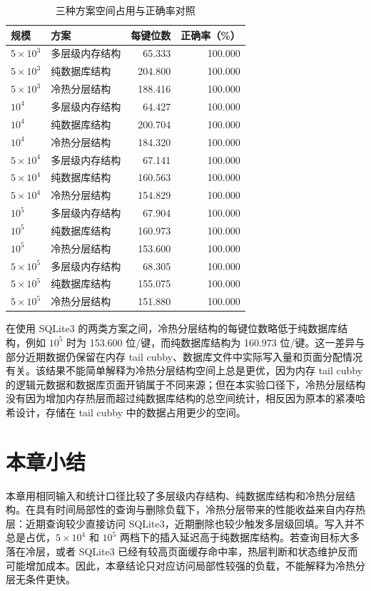 \begin{table}[htbp]
  \centering
  \caption{三种方案空间占用与正确率对照}
  \label{tab:hotcold-space-correctness}
  \small
  \begin{tabular}{llrr}
    \toprule
    规模 & 方案 & 每键位数 & 正确率（\%） \\
    \midrule
    \(5\times10^3\)   & 多层级内存结构 & 65.333  & 100.000 \\
    \(5\times10^3\)   & 纯数据库结构   & 204.800 & 100.000 \\
    \(5\times10^3\)   & 冷热分层结构   & 188.416 & 100.000 \\
    \(10^4\)          & 多层级内存结构 & 64.427  & 100.000 \\
    \(10^4\)          & 纯数据库结构   & 200.704 & 100.000 \\
    \(10^4\)          & 冷热分层结构   & 184.320 & 100.000 \\
    \(5\times10^4\)   & 多层级内存结构 & 67.141  & 100.000 \\
    \(5\times10^4\)   & 纯数据库结构   & 160.563 & 100.000 \\
    \(5\times10^4\)   & 冷热分层结构   & 154.829 & 100.000 \\
    \(10^5\)          & 多层级内存结构 & 67.904  & 100.000 \\
    \(10^5\)          & 纯数据库结构   & 160.973 & 100.000 \\
    \(10^5\)          & 冷热分层结构   & 153.600 & 100.000 \\
    \(5\times10^5\)   & 多层级内存结构 & 68.305  & 100.000 \\
    \(5\times10^5\)   & 纯数据库结构   & 155.075 & 100.000 \\
    \(5\times10^5\)   & 冷热分层结构   & 151.880 & 100.000 \\
    \bottomrule
  \end{tabular}
\end{table}

在使用 SQLite3 的两类方案之间，冷热分层结构的每键位数略低于纯数据库结构，例如 \(10^5\) 时为 153.600 位/键，而纯数据库结构为 160.973 位/键。这一差异与部分近期数据仍保留在内存 tail cubby、数据库文件中实际写入量和页面分配情况有关。该结果不能简单解释为冷热分层结构空间上总是更优，因为内存 tail cubby 的逻辑元数据和数据库页面开销属于不同来源；但在本实验口径下，冷热分层结构没有因为增加内存热层而超过纯数据库结构的总空间统计，相反因为原本的紧凑哈希设计，存储在 tail cubby 中的数据占用更少的空间。

\section{本章小结}

本章用相同输入和统计口径比较了多层级内存结构、纯数据库结构和冷热分层结构。在具有时间局部性的查询与删除负载下，冷热分层带来的性能收益来自内存热层：近期查询较少直接访问 SQLite3，近期删除也较少触发多层级回填。写入并不总是占优，\(5\times10^4\) 和 \(10^5\) 两档下的插入延迟高于纯数据库结构。若查询目标大多落在冷层，或者 SQLite3 已经有较高页面缓存命中率，热层判断和状态维护反而可能增加成本。因此，本章结论只对应访问局部性较强的负载，不能解释为冷热分层无条件更快。
